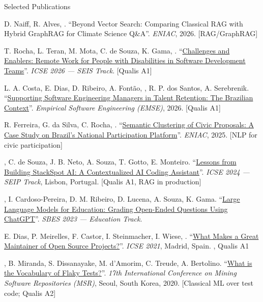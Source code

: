 \begin{rubric}{Selected Publications}

\entry*[2026]
  D. Naiff, R. Alves, \me. ``Beyond Vector Search: Comparing Classical RAG with Hybrid GraphRAG
  for Climate Science Q\&A''. \emph{ENIAC}, 2026. {\footnotesize\textcolor{MarkerColour}{[RAG/GraphRAG]}}

\entry*
  T. Rocha, L. Teran, M. Mota, C. de Souza, K. Gama, \me.
  ``\href{https://arxiv.org/abs/2512.12965}{Challenges and Enablers: Remote Work for People with
  Disabilities in Software Development Teams}''. \emph{ICSE 2026 --- SEIS Track}. {\footnotesize\textcolor{MarkerColour}{[Qualis A1]}}

\entry*
  L. A. Costa, E. Dias, D. Ribeiro, A. Fontão, \me, R. P. dos Santos, A. Serebrenik.
  ``\href{http://gustavopinto.github.io/lost+found/emse2026.pdf}{Supporting Software Engineering
  Managers in Talent Retention: The Brazilian Context}''. \emph{Empirical Software Engineering (EMSE)}, 2026. {\footnotesize\textcolor{MarkerColour}{[Qualis A1]}}

\entry*[2025]
  R. Ferreira, G. da Silva, C. Rocha, \me. ``\href{https://arxiv.org/abs/2509.21292v2}{Semantic
  Clustering of Civic Proposals: A Case Study on Brazil's National Participation Platform}''.
  \emph{ENIAC}, 2025. {\footnotesize\textcolor{MarkerColour}{[NLP for civic participation]}}

\entry*[2024]
  \me, C. de Souza, J. B. Neto, A. Souza, T. Gotto, E. Monteiro.
  ``\href{https://arxiv.org/abs/2311.18450}{Lessons from Building StackSpot AI: A Contextualized
  AI Coding Assistant}''. \emph{ICSE 2024 --- SEIP Track}, Lisbon, Portugal.
  {\footnotesize\textcolor{MarkerColour}{[Qualis A1, RAG in production]}}

\entry*[2023]
  \me, I. Cardoso-Pereira, D. M. Ribeiro, D. Lucena, A. Souza, K. Gama.
  ``\href{https://arxiv.org/abs/2307.16696}{Large Language Models for Education: Grading
  Open-Ended Questions Using ChatGPT}''. \emph{SBES 2023 --- Education Track}.
  {\footnotesize{}}

\entry*[2021]
  E. Dias, P. Meirelles, F. Castor, I. Steinmacher, I. Wiese, \me.
  ``\href{http://gustavopinto.github.io/lost+found/icse2021.pdf}{What Makes a Great Maintainer of
  Open Source Projects?}''. \emph{ICSE 2021}, Madrid, Spain.
  {\footnotesize{}}{\footnotesize\textcolor{MarkerColour}{, Qualis A1}}

\entry*[2020]
  \me, B. Miranda, S. Dissanayake, M. d'Amorim, C. Treude, A. Bertolino.
  ``\href{http://gustavopinto.github.io/lost+found/msr2020.pdf}{What is the Vocabulary of Flaky
  Tests?}''. \emph{17th International Conference on Mining Software Repositories (MSR)}, Seoul,
  South Korea, 2020.
  {\footnotesize\textcolor{MarkerColour}{[Classical ML over test code; Qualis A2]}}

\end{rubric}
